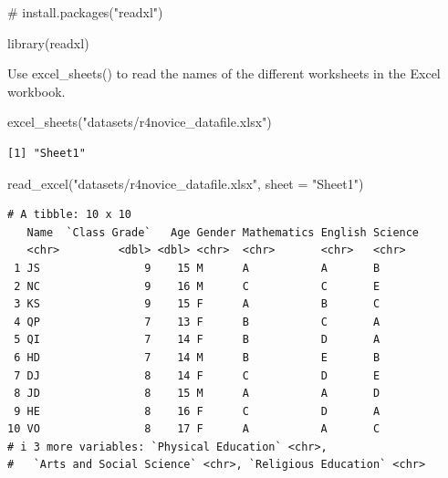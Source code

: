 \documentclass[
  letterpaper,
  DIV=11,
  numbers=noendperiod]{scrreprt}
\newenvironment{Shaded}{\begin{snugshade}}{\end{snugshade}}
\newcommand{\AttributeTok}[1]{\textcolor[rgb]{0.40,0.45,0.13}{#1}}
\newcommand{\CommentTok}[1]{\textcolor[rgb]{0.37,0.37,0.37}{#1}}
\newcommand{\FunctionTok}[1]{\textcolor[rgb]{0.28,0.35,0.67}{#1}}
\newcommand{\NormalTok}[1]{\textcolor[rgb]{0.00,0.23,0.31}{#1}}
\newcommand{\StringTok}[1]{\textcolor[rgb]{0.13,0.47,0.30}{#1}}
\begin{document}
\begin{Shaded}
\begin{Highlighting}[]
\CommentTok{\# install.packages("readxl")}
\end{Highlighting}
\end{Shaded}

\begin{Shaded}
\begin{Highlighting}[]
\FunctionTok{library}\NormalTok{(readxl)}
\end{Highlighting}
\end{Shaded}

Use excel\_sheets() to read the names of the different worksheets in the
Excel workbook.

\begin{Shaded}
\begin{Highlighting}[]
\FunctionTok{excel\_sheets}\NormalTok{(}\StringTok{"datasets/r4novice\_datafile.xlsx"}\NormalTok{)}
\end{Highlighting}
\end{Shaded}

\begin{verbatim}
[1] "Sheet1"
\end{verbatim}

\begin{Shaded}
\begin{Highlighting}[]
\FunctionTok{read\_excel}\NormalTok{(}\StringTok{"datasets/r4novice\_datafile.xlsx"}\NormalTok{, }\AttributeTok{sheet =} \StringTok{"Sheet1"}\NormalTok{)}
\end{Highlighting}
\end{Shaded}

\begin{verbatim}
# A tibble: 10 x 10
   Name  `Class Grade`   Age Gender Mathematics English Science
   <chr>         <dbl> <dbl> <chr>  <chr>       <chr>   <chr>  
 1 JS                9    15 M      A           A       B      
 2 NC                9    16 M      C           C       E      
 3 KS                9    15 F      A           B       C      
 4 QP                7    13 F      B           C       A      
 5 QI                7    14 F      B           D       A      
 6 HD                7    14 M      B           E       B      
 7 DJ                8    14 F      C           D       E      
 8 JD                8    15 M      A           A       D      
 9 HE                8    16 F      C           D       A      
10 VO                8    17 F      A           A       C      
# i 3 more variables: `Physical Education` <chr>,
#   `Arts and Social Science` <chr>, `Religious Education` <chr>
\end{verbatim}
\end{document}
